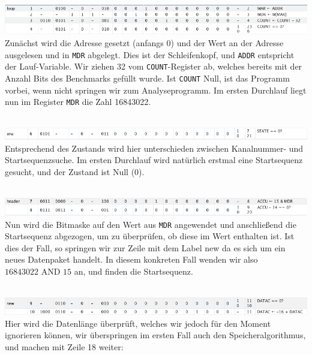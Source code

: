 \documentclass[12pt,titlepage]{article}
\begin{document}
\includegraphics[width=16cm]{listing/row1-4.png}
\leavevmode \\

Zunächst wird die Adresse gesetzt (anfangs 0) und der Wert an der Adresse ausgelesen und in \texttt{MDR} abgelegt.
Dies ist der Schleifenkopf, und \texttt{ADDR} entspricht der Lauf-Variable.
Wir ziehen 32 vom \texttt{COUNT}-Register ab, welches bereits mit der Anzahl Bits des Benchmarks gefüllt wurde.
Ist \texttt{COUNT} Null, ist das Programm vorbei, wenn nicht springen wir zum Analyseprogramm.
Im ersten Durchlauf liegt nun im Register \texttt{MDR} die Zahl 16843022.

\leavevmode \\
\includegraphics[width=16cm]{listing/row6.png}
\leavevmode \\

Entsprechend des Zustands wird hier unterschieden zwischen Kanalnummer- und Startsequenzsuche. Im ersten Durchlauf
wird natürlich erstmal eine Startsequenz gesucht, und der Zustand ist Null (0).

\leavevmode \\
\includegraphics[width=16cm]{listing/row7-8.png}
\leavevmode \\

Nun wird die Bitmaske auf den Wert aus \texttt{MDR} angewendet und anschließend die Startsequenz abgezogen, um
zu überprüfen, ob diese im Wert enthalten ist. Ist dies der Fall, so springen wir zur Zeile mit dem Label \dq new\dq
da es sich um ein neues Datenpaket handelt. In diesem konkreten Fall wenden wir also $16843022 \text{ AND } 15$ an, und finden
die Startsequenz.

\leavevmode \\
\includegraphics[width=16cm]{listing/row9-10.png}
\leavevmode \\

Hier wird die Datenlänge überprüft, welches wir jedoch für den Moment ignorieren können, wir überspringen im ersten Fall auch den Speicheralgorithmus, 
und machen mit Zeile 18 weiter:
\end{document}
